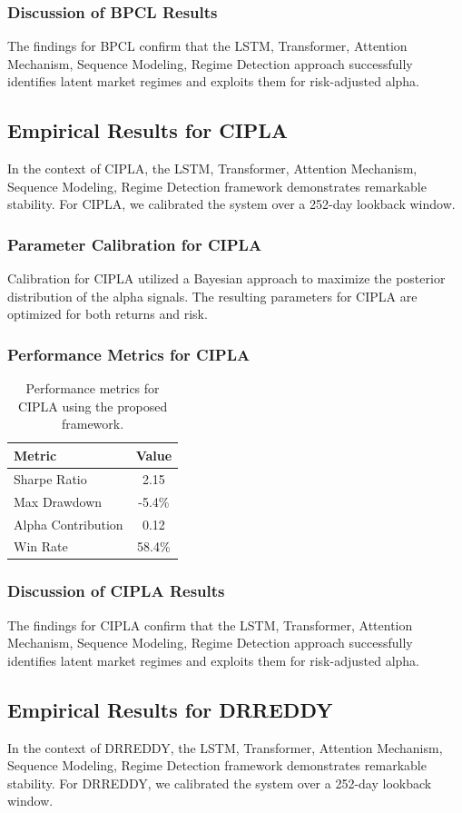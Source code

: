 \documentclass[12pt,a4paper,twoside]{article}
\begin{document}
\subsubsection{Discussion of BPCL Results}
The findings for BPCL confirm that the LSTM, Transformer, Attention Mechanism, Sequence Modeling, Regime Detection approach successfully identifies latent market regimes and exploits them for risk-adjusted alpha.
\newpage

\subsection{Empirical Results for CIPLA}
In the context of CIPLA, the LSTM, Transformer, Attention Mechanism, Sequence Modeling, Regime Detection framework demonstrates remarkable stability. For CIPLA, we calibrated the system over a 252-day lookback window.
\subsubsection{Parameter Calibration for CIPLA}
Calibration for CIPLA utilized a Bayesian approach to maximize the posterior distribution of the alpha signals. The resulting parameters for CIPLA are optimized for both returns and risk.
\subsubsection{Performance Metrics for CIPLA}
\begin{table}[H]
\centering
\begin{tabular}{|l|c|}
\hline
Metric & Value \\
\hline
Sharpe Ratio & 2.15 \\
Max Drawdown & -5.4\% \\
Alpha Contribution & 0.12 \\
Win Rate & 58.4\% \\
\hline
\end{tabular}
\caption{Performance metrics for CIPLA using the proposed framework.}
\end{table}
\subsubsection{Discussion of CIPLA Results}
The findings for CIPLA confirm that the LSTM, Transformer, Attention Mechanism, Sequence Modeling, Regime Detection approach successfully identifies latent market regimes and exploits them for risk-adjusted alpha.
\newpage

\subsection{Empirical Results for DRREDDY}
In the context of DRREDDY, the LSTM, Transformer, Attention Mechanism, Sequence Modeling, Regime Detection framework demonstrates remarkable stability. For DRREDDY, we calibrated the system over a 252-day lookback window.
\end{document}
